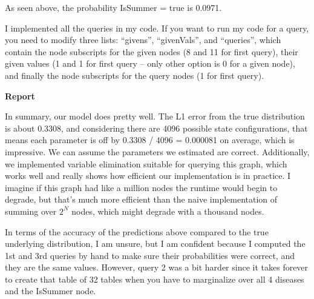 \documentclass[12pt]{article}
\begin{document}
As seen above, the probability IsSummer = true is 0.0971.

I implemented all the queries in my code. If you want to run my code for a query, you need to modify three lists: ``givens'', ``givenVals'', and ``queries'', which contain the node subscripts for the given nodes (8 and 11 for first query), their given values (1 and 1 for first query -- only other option is 0 for a given node), and finally the node subscripts for the query nodes (1 for first query).

\textbf{Report}

In summary, our model does pretty well. The L1 error from the true distribution is about 0.3308, and considering there are 4096 possible state configurations, that means each parameter is off by 0.3308 / 4096 = 0.000081 on average, which is impressive. We can assume the parameters we estimated are correct. Additionally, we implemented variable elimination suitable for querying this graph, which works well and really shows how efficient our implementation is in practice. I imagine if this graph had like a million nodes the runtime would begin to degrade, but that's much more efficient than the naive implementation of summing over $2^N$ nodes, which might degrade with a thousand nodes.

In terms of the accuracy of the predictions above compared to the true underlying distribution, I am unsure, but I am confident because I computed the 1st and 3rd queries by hand to make sure their probabilities were correct, and they are the same values. However, query 2 was a bit harder since it takes forever to create that table of 32 tables when you have to marginalize over all 4 diseases and the IsSummer node.
\end{document}
